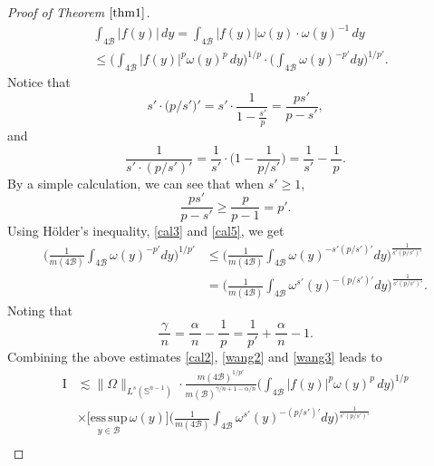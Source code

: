 \documentclass[preprint,10pt]{elsarticle}
\numberwithin{equation}{section}
\begin{document}
\begin{proof}[Proof of Theorem $\ref{thm1}$]
\begin{equation}\label{wang2}
\begin{split}
&\int_{4\mathcal{B}}|f(y)|\,dy=\int_{4\mathcal{B}}|f(y)|\omega(y)\cdot\omega(y)^{-1}\,dy\\
&\leq\bigg(\int_{4\mathcal{B}}|f(y)|^p\omega(y)^p\,dy\bigg)^{1/p}\cdot\bigg(\int_{4\mathcal{B}}\omega(y)^{-p'}dy\bigg)^{1/{p'}}.
\end{split}
\end{equation}
Notice that
\begin{equation}\label{cal3}
s'\cdot\big(p/{s'}\big)'=s'\cdot\frac{1}{1-\frac{s'}{p}}=\frac{ps'}{p-s'},
\end{equation}
and
\begin{equation}\label{cal4}
\frac{1}{s'\cdot(p/{s'})'}=\frac{1}{s'}\cdot\Big(1-\frac{1}{p/{s'}}\Big)=\frac{1}{s'}-\frac{\,1\,}{p}.
\end{equation}
By a simple calculation, we can see that when $s'\geq1$,
\begin{equation}\label{cal5}
\frac{ps'}{p-s'}\geq\frac{p}{p-1}=p'.
\end{equation}
Using H\"older's inequality, \eqref{cal3} and \eqref{cal5}, we get
\begin{equation}\label{wang3}
\begin{split}
\bigg(\frac{1}{m(4\mathcal{B})}\int_{4\mathcal{B}} \omega(y)^{-p'}dy\bigg)^{1/{p'}}
&\leq\bigg(\frac{1}{m(4\mathcal{B})}\int_{4\mathcal{B}} \omega(y)^{-s'(p/{s'})'}dy\bigg)^{\frac{1}{s'(p/{s'})'}}\\
&=\bigg(\frac{1}{m(4\mathcal{B})}\int_{4\mathcal{B}}\omega^{s'}(y)^{-(p/{s'})'}dy\bigg)^{\frac{1}{s'(p/{s'})'}}.
\end{split}
\end{equation}
Noting that
\begin{equation*}
\frac{\gamma}{\,n\,}=\frac{\alpha}{\,n\,}-\frac{1}{\,p\,}=\frac{1}{p'}+\frac{\alpha}{\,n\,}-1.
\end{equation*}
Combining the above estimates \eqref{cal2}, \eqref{wang2} and \eqref{wang3} leads to
\begin{equation*}
\begin{split}
\mathrm{I}&\lesssim\|\Omega\|_{L^s(\mathbb{S}^{n-1})}\cdot
\frac{m(4\mathcal{B})^{1/{p'}}}{m(\mathcal{B})^{\gamma/n+1-\alpha/n}}
\bigg(\int_{4\mathcal{B}}|f(y)|^p\omega(y)^{p}\,dy\bigg)^{1/p}\\
&\times\Big[\underset{y\in \mathcal{B}}{\mathrm{ess\,sup}}\,\omega(y)\Big]
\bigg(\frac{1}{m(4\mathcal{B})}\int_{4\mathcal{B}}\omega^{s'}(y)^{-(p/{s'})'}dy\bigg)^{\frac{1}{s'(p/{s'})'}}\\

\end{split}
\end{equation*}
\end{proof}
\end{document}
